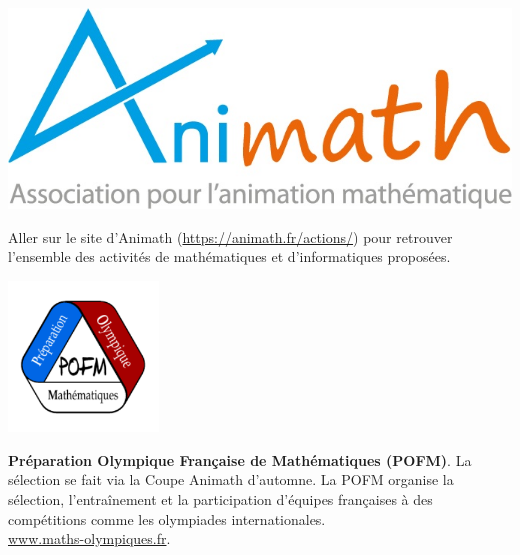 

\begin{center}
\includegraphics[scale=0.4]{01-Intro/logos/animath.jpg}
\end{center}

\vfill

Aller sur le site d'Animath (\url{https://animath.fr/actions/}) pour retrouver l’ensemble des activités de mathématiques et d’informatiques proposées.
\vfill
\vspace{4mm}

\begin{minipage}[c]{.46\linewidth}
\includegraphics[width=40mm]{01-Intro/logos/pofm.png}
\end{minipage}
\begin{minipage}[c]{.46\linewidth}
\textbf{Préparation Olympique Française de Mathématiques (POFM)}.
 La sélection se fait via la Coupe Animath d'automne. La POFM organise la sélection, l’entraînement et la participation d’équipes françaises à des compétitions comme les olympiades internationales.\\
 \url{www.maths-olympiques.fr}.
\end{minipage} \hfill

\vfill
\vspace{4mm}

\vfill

